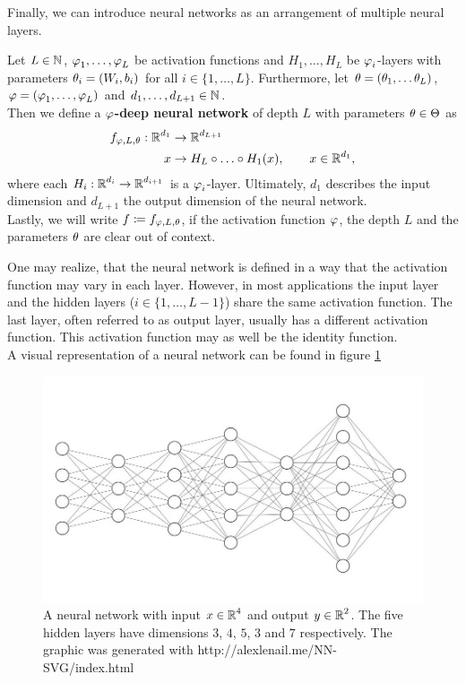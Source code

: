 Finally, we can introduce neural networks as an arrangement of multiple neural layers.


\begin{definition}
Let $L\in\operatorname{\mathbb{N}}$, $\operatorname{\varphi}_1,\ldots,\operatorname{\varphi}_L$ be activation functions and $H_1, \ldots, H_L$ be $\operatorname{\varphi}_i$-layers with parameters $\theta_i = (W_i, b_i)$ for all $i \in \{1,\ldots,L\}$. Furthermore, let  $\theta = (\theta_1, \ldots \theta_L)$, $\operatorname{\varphi} = (\operatorname{\varphi}_1, \ldots, \operatorname{\varphi}_L)$ and $d_1,\ldots,d_{L+1}\in\operatorname{\mathbb{N}}$.\\
Then we define a \textbf{$\operatorname{\varphi}$-deep neural network} of depth $L$ with parameters $\theta \in \operatorname{\Theta}$ as
\begin{align}
f_{\operatorname{\varphi}, L, \theta}: \operatorname{\mathbb{R}}^{d_1} &\to \operatorname{\mathbb{R}}^{d_{L+1}}\nonumber\\
x &\to H_L \circ \ldots \circ H_1 (x), \qquad x \in \operatorname{\mathbb{R}}^{d_1},
\end{align}
where each $H_i: \operatorname{\mathbb{R}}^{d_i} \to \operatorname{\mathbb{R}}^{d_{i+1}}$ is a $\operatorname{\varphi}_i$-layer. Ultimately, $d_1$ describes the input dimension and $d_{L+1}$ the output dimension of the neural network.\\
Lastly, we will write $f\coloneqq f_{\operatorname{\varphi}, L, \theta}$, if the activation function $\operatorname{\varphi}$, the depth $L$ and the parameters $\theta$ are clear out of context.
\end{definition}

One may realize, that the neural network is defined in a way that the activation function may vary in each layer. However, in most applications the input layer and the hidden layers ($i \in \{1, \ldots, L-1\}$) share the same activation function. The last layer, often referred to as output layer, usually has a different activation function. This activation function may as well be the identity function.\\
A visual representation of a neural network can be found in figure \ref{img_nn}


\begin{figure}[H]
\begin{center}
   \begin{minipage}[b]{0.9\linewidth}
      \includegraphics[width=\linewidth]{neural_net}
      \caption{A neural network with input $x\in \operatorname{\mathbb{R}}^4$ and output $y\in\operatorname{\mathbb{R}}^2$. The five hidden layers have dimensions $3$, $4$, $5$, $3$ and $7$ respectively. The graphic was generated with http://alexlenail.me/NN-SVG/index.html}\label{img_nn}
	\end{minipage}
\end{center}
\end{figure}


